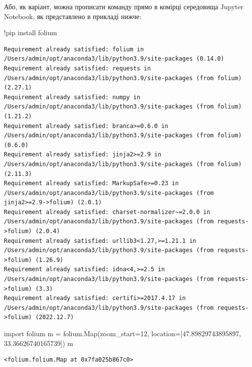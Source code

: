 \documentclass[
  letterpaper,
]{report}
\newenvironment{Shaded}{\begin{snugshade}}{\end{snugshade}}
\newcommand{\DecValTok}[1]{\textcolor[rgb]{0.68,0.00,0.00}{#1}}
\newcommand{\FloatTok}[1]{\textcolor[rgb]{0.68,0.00,0.00}{#1}}
\newcommand{\ImportTok}[1]{\textcolor[rgb]{0.00,0.46,0.62}{#1}}
\newcommand{\NormalTok}[1]{\textcolor[rgb]{0.00,0.23,0.31}{#1}}
\newcommand{\OperatorTok}[1]{\textcolor[rgb]{0.37,0.37,0.37}{#1}}
\begin{document}
Або, як варіант, можна прописати команду прямо в комірці середовища
Jupyter Notebook, як представлено в прикладі нижче:

\begin{Shaded}
\begin{Highlighting}[]
\OperatorTok{!}\NormalTok{pip install folium}
\end{Highlighting}
\end{Shaded}

\begin{verbatim}
Requirement already satisfied: folium in /Users/admin/opt/anaconda3/lib/python3.9/site-packages (0.14.0)
Requirement already satisfied: requests in /Users/admin/opt/anaconda3/lib/python3.9/site-packages (from folium) (2.27.1)
Requirement already satisfied: numpy in /Users/admin/opt/anaconda3/lib/python3.9/site-packages (from folium) (1.21.2)
Requirement already satisfied: branca>=0.6.0 in /Users/admin/opt/anaconda3/lib/python3.9/site-packages (from folium) (0.6.0)
Requirement already satisfied: jinja2>=2.9 in /Users/admin/opt/anaconda3/lib/python3.9/site-packages (from folium) (2.11.3)
Requirement already satisfied: MarkupSafe>=0.23 in /Users/admin/opt/anaconda3/lib/python3.9/site-packages (from jinja2>=2.9->folium) (2.0.1)
Requirement already satisfied: charset-normalizer~=2.0.0 in /Users/admin/opt/anaconda3/lib/python3.9/site-packages (from requests->folium) (2.0.4)
Requirement already satisfied: urllib3<1.27,>=1.21.1 in /Users/admin/opt/anaconda3/lib/python3.9/site-packages (from requests->folium) (1.26.9)
Requirement already satisfied: idna<4,>=2.5 in /Users/admin/opt/anaconda3/lib/python3.9/site-packages (from requests->folium) (3.3)
Requirement already satisfied: certifi>=2017.4.17 in /Users/admin/opt/anaconda3/lib/python3.9/site-packages (from requests->folium) (2022.12.7)
\end{verbatim}

\begin{Shaded}
\begin{Highlighting}[]
\ImportTok{import}\NormalTok{ folium}
\NormalTok{m }\OperatorTok{=}\NormalTok{ folium.Map(zoom\_start}\OperatorTok{=}\DecValTok{12}\NormalTok{, location}\OperatorTok{=}\NormalTok{[}\FloatTok{47.89829743895897}\NormalTok{, }\FloatTok{33.36626740165739}\NormalTok{])}
\NormalTok{m}
\end{Highlighting}
\end{Shaded}

\begin{verbatim}
<folium.folium.Map at 0x7fa025b867c0>
\end{verbatim}
\end{document}
